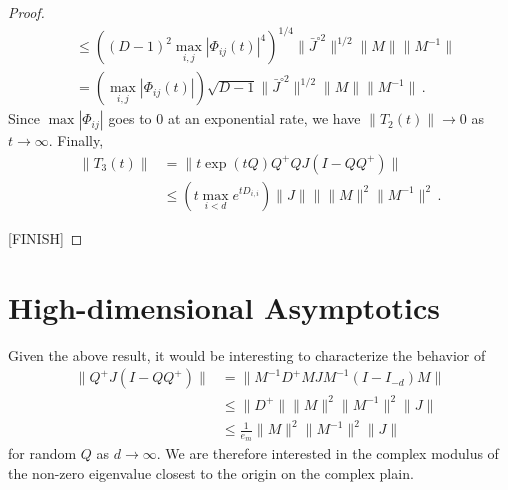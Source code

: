 \documentclass[twoside]{article}
\numberwithin{equation}{section}
\newcommand{\tr}{\mbox{Tr}}
\begin{document}
\begin{proof}
\begin{align*}
	&\leq \left( (D-1)^2 \max_{i,j} |\Phi_{ij}(t)|^4 \right)^{1/4}   \lVert \bar{J}^{\circ 2} \rVert^{1/2}   \lVert M \rVert \lVert M^{-1}  \rVert  \\
	&= \left( \max_{i,j} |\Phi_{ij}(t)| \right)\sqrt{D-1} \lVert \bar{J}^{\circ 2} \rVert^{1/2}   \lVert M \rVert \lVert M^{-1}  \rVert  \, .
\end{align*}
Since $\max |\Phi_{ij}|$ goes to 0 at an exponential rate, we have $\lVert T_2(t)\rVert \rightarrow 0$ as $t\rightarrow \infty$.  Finally,
\begin{align*}
	\lVert T_3(t) \rVert &= \lVert t \exp(tQ) Q^+ Q J( I - QQ^+)  \rVert \\
	&\leq \left(t \max_{i<d} e^{tD_{i,i}} \right) \lVert J \rVert  \rVert \lVert M \rVert^2 \lVert M^{-1} \rVert^2 \, .
\end{align*}
 


[FINISH]
\end{proof}


\section{High-dimensional Asymptotics}


Given the above result, it would be interesting to characterize the behavior of 
\begin{align*}
\lVert	Q^+ J (I-QQ^+)  \rVert &= \lVert M^{-1}D^+M J M^{-1} (I-I_{-d}) M \rVert \\
&\leq \lVert D^+ \rVert \lVert M\rVert^2 \lVert M^{-1}\rVert^2 \lVert J \rVert  \\
&\leq \frac{1}{e_m}\lVert M\rVert^2 \lVert M^{-1}\rVert^2 \lVert J \rVert  
\end{align*}
for random $Q$ as $d\rightarrow \infty$.  We are therefore interested in the complex modulus of the non-zero eigenvalue closest to the origin on the complex plain. 
\end{document}
